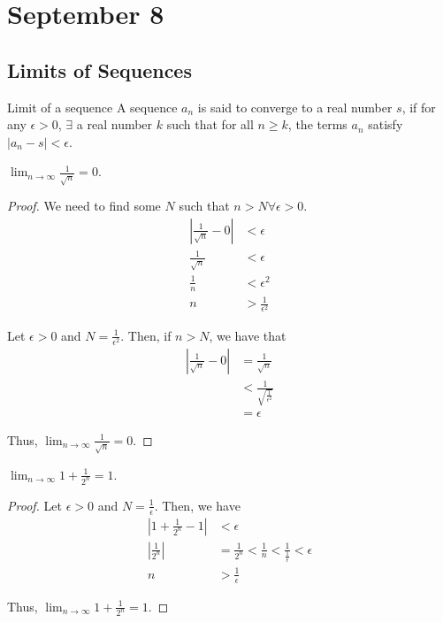 \chapter{September 8}

\section{Limits of Sequences}
\begin{definition}{Limit of a sequence}{}
    A sequence $a_n$ is said to converge to a real number $s$, if for any $\epsilon > 0$, $\exists$ a real number $k$ such that for all $n \geq k$, the terms $a_n$ satisfy $|a_n - s| < \epsilon$.
\end{definition}

\begin{theorem}{}{}
    $\lim_{n \to \infty} \frac{1}{\sqrt{n}} = 0$.
\end{theorem}
\begin{proof}
    We need to find some $N$ such that $n > N \forall \epsilon > 0$.
    \begin{align*}
        | \frac{1}{\sqrt{n}} - 0 | &< \epsilon \\
        \frac{1}{\sqrt{n}} &< \epsilon \\
        \frac{1}{n} &< \epsilon^2 \\
        n &> \frac{1}{\epsilon^2}
    \end{align*}
    
    Let $\epsilon > 0$ and $N = \frac{1}{\epsilon^2}$. Then, if $n > N$, we have that
    \begin{align*}
        | \frac{1}{\sqrt{n}} - 0 | &= \frac{1}{\sqrt{n}} \\
        &< \frac{1}{\sqrt{\frac{1}{\epsilon^2}}} \\
        &= \epsilon
    \end{align*}

    Thus, $\lim_{n \to \infty} \frac{1}{\sqrt{n}} = 0$.
\end{proof}

\begin{theorem}{}{}
    $\lim_{n \to \infty} 1 + \frac{1}{2^n} = 1$.
\end{theorem}
\begin{proof}
    Let $\epsilon > 0$ and $N = \frac{1}{\epsilon}$. Then, we have
    \begin{align*}
        | 1 + \frac{1}{2^n} - 1 | &< \epsilon \\
        | \frac{1}{2^n} | &= \frac{1}{2^n} < \frac{1}{n} < \frac{1}{\frac{1}{\epsilon}} < \epsilon \\
        n &> \frac{1}{\epsilon}
    \end{align*}

    Thus, $\lim_{n \to \infty} 1 + \frac{1}{2^n} = 1$.
\end{proof}

